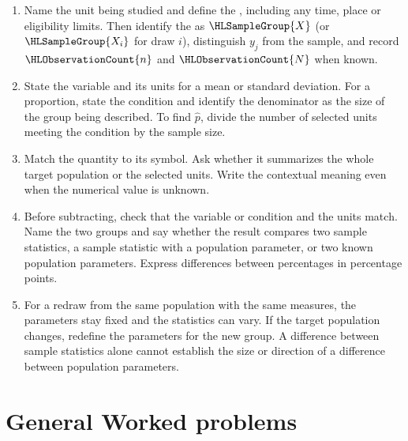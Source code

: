 	\begin{enumerate}
		\item Name the unit being studied and define the , including any time, place or eligibility limits. Then identify the  as $\HLSampleGroup{X}$ (or $\HLSampleGroup{X_i}$ for draw $i$), distinguish $y_j$ from the sample, and record $\HLObservationCount{n}$ and $\HLObservationCount{N}$ when known.
		\item State the variable and its units for a mean or standard deviation. For a proportion, state the condition and identify the denominator as the size of the group being described. To find $\hat{p}$, divide the number of selected units meeting the condition by the sample size.
		\item Match the quantity to its symbol. Ask whether it summarizes the whole target population or the selected units. Write the contextual meaning even when the numerical value is unknown.
		\item Before subtracting, check that the variable or condition and the units match. Name the two groups and say whether the result compares two sample statistics, a sample statistic with a population parameter, or two known population parameters. Express differences between percentages in percentage points.
		\item For a redraw from the same population with the same measures, the parameters stay fixed and the statistics can vary. If the target population changes, redefine the parameters for the new group. A difference between sample statistics alone cannot establish the size or direction of a difference between population parameters.
	\end{enumerate}


	
	\section{General Worked problems}
	\label{sec:worked-solution-examples}


